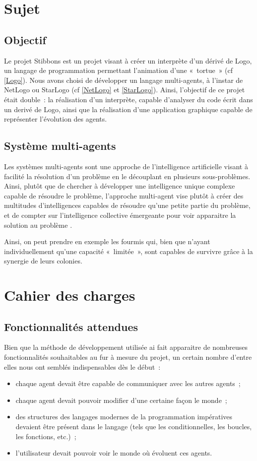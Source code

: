 \section{Sujet}
	\subsection{Objectif}
	Le projet Stibbons est un projet visant à créer un interprète d'un dérivé de Logo, un langage de programmation permettant l'animation d'une «~tortue~» (cf \ref{Logo}). Nous avons choisi de développer un langage multi-agents, à l'instar de NetLogo ou StarLogo (cf \ref{NetLogo} et \ref{StarLogo}). Ainsi, l'objectif de ce projet était double~: la réalisation d'un interprète, capable d'analyser du code écrit dans un derivé de Logo, ainsi que la réalisation d'une application graphique capable de représenter l'évolution des agents.

	\subsection{Système multi-agents}
	Les systèmes multi-agents sont une approche de l'intelligence artificielle visant à facilité la résolution d'un problème en le découplant en plusieurs sous-problèmes. Ainsi, plutôt que de chercher à développer une intelligence unique complexe capable de résoudre le problème, l'approche multi-agent vise plutôt à créer des multitudes d'intelligences capables de résoudre qu'une petite partie du problème, et de compter sur l'intelligence collective émergeante pour voir apparaitre la solution au problème \cite{sma}.

	Ainsi, on peut prendre en exemple les fourmis qui, bien que n'ayant individuellement qu'une capacité «~limitée~», sont capables de survivre grâce à la synergie de leurs colonies.

\section{Cahier des charges}
	\subsection{Fonctionnalités attendues}
	Bien que la méthode de développement utilisée ai fait apparaitre de nombreuses fonctionnalités souhaitables au fur à mesure du projet, un certain nombre d'entre elles nous ont semblés indispensables dès le début~:
	\begin{itemize}
		\item chaque agent devait être capable de communiquer avec les autres agents~;
		\item chaque agent devait pouvoir modifier d'une certaine façon le monde~;
		\item des structures des langages modernes de la programmation impératives devaient être présent dans le langage (tels que les conditionnelles, les boucles, les fonctions, etc.)~;
		\item l'utilisateur devait pouvoir voir le monde où évoluent ces agents.
	\end{itemize}

